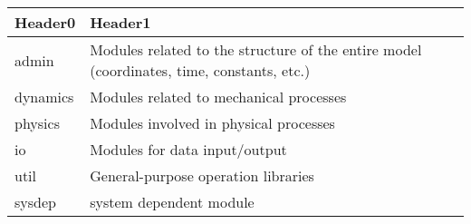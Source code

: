 \begin{longtable}[]{@{}ll@{}}
\toprule
\begin{minipage}[b]{0.47\columnwidth}\raggedright
Header0\strut
\end{minipage} & \begin{minipage}[b]{0.47\columnwidth}\raggedright
Header1\strut
\end{minipage}\tabularnewline
\midrule
\endhead
\begin{minipage}[t]{0.47\columnwidth}\raggedright
admin\strut
\end{minipage} & \begin{minipage}[t]{0.47\columnwidth}\raggedright
Modules related to the structure of the entire model (coordinates, time,
constants, etc.)\strut
\end{minipage}\tabularnewline
\begin{minipage}[t]{0.47\columnwidth}\raggedright
dynamics\strut
\end{minipage} & \begin{minipage}[t]{0.47\columnwidth}\raggedright
Modules related to mechanical processes\strut
\end{minipage}\tabularnewline
\begin{minipage}[t]{0.47\columnwidth}\raggedright
physics\strut
\end{minipage} & \begin{minipage}[t]{0.47\columnwidth}\raggedright
Modules involved in physical processes\strut
\end{minipage}\tabularnewline
\begin{minipage}[t]{0.47\columnwidth}\raggedright
io\strut
\end{minipage} & \begin{minipage}[t]{0.47\columnwidth}\raggedright
Modules for data input/output\strut
\end{minipage}\tabularnewline
\begin{minipage}[t]{0.47\columnwidth}\raggedright
util\strut
\end{minipage} & \begin{minipage}[t]{0.47\columnwidth}\raggedright
General-purpose operation libraries\strut
\end{minipage}\tabularnewline
\begin{minipage}[t]{0.47\columnwidth}\raggedright
sysdep\strut
\end{minipage} & \begin{minipage}[t]{0.47\columnwidth}\raggedright
system dependent module\strut
\end{minipage}\tabularnewline

\end{longtable}
